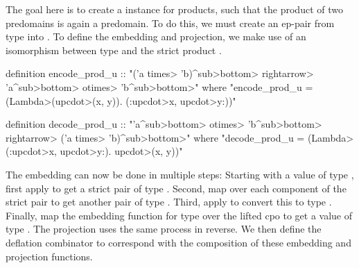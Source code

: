 The goal here is to create a  instance for products, such that the product of two predomains is again a predomain. To do this, we must create an ep-pair from type  into . To define the embedding and projection, we make use of an isomorphism between type  and the strict product .

\begin{isacode}
definition encode_prod_u :: "('a \<times> 'b)\<^sub>\<bottom> \<rightarrow> 'a\<^sub>\<bottom> \<otimes> 'b\<^sub>\<bottom>"
  where "encode_prod_u = (\<Lambda>(up\<cdot>(x, y)). (:up\<cdot>x, up\<cdot>y:))"
\end{isacode}
\unmedskip
{}
\begin{isacode}
definition decode_prod_u :: "'a\<^sub>\<bottom> \<otimes> 'b\<^sub>\<bottom> \<rightarrow> ('a \<times> 'b)\<^sub>\<bottom>"
  where "decode_prod_u = (\<Lambda>(:up\<cdot>x, up\<cdot>y:). up\<cdot>(x, y))"
\end{isacode}

The embedding can now be done in multiple steps: Starting with a value of type , first apply  to get a strict pair of type . Second, map  over each component of the strict pair to get another pair of type . Third, apply  to convert this to type . Finally, map the embedding function for type  over the lifted cpo to get a value of type . The projection uses the same process in reverse. We then define the deflation combinator  to correspond with the composition of these embedding and projection functions.

